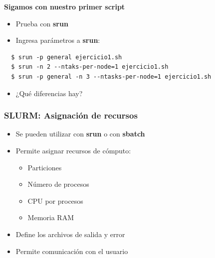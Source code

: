 \documentclass[aspectratio=169,professionalfonts]{beamer}
\newenvironment{minted}[2][]{\VerbatimEnvironment\begin{Verbatim}[#1]}{\end{Verbatim}}
\begin{document}
\begin{frame}[fragile]
{\textbf{Sigamos con nuestro primer script}}
\begin{itemize}
    \item Prueba con \textbf{srun}\vspace{0.5em}
    \vspace{0.5em}
    \item Ingresa parámetros a \textbf{srun}:
    \vspace{0.5em}
   \end{itemize} 



  \begin{verbatim}
  $ srun -p general ejercicio1.sh
  $ srun -n 2 --ntaks-per-node=1 ejercicio1.sh
  $ srun -p general -n 3 --ntasks-per-node=1 ejercicio1.sh
  \end{verbatim} 
  \vspace{0.5em}
    \begin{itemize}
        \item ¿Qué diferencias hay?
    \end{itemize}
    \end{frame}

\begin{frame}[fragile]
\frametitle{\textbf{SLURM: Asignación de recursos}}
\begin{itemize}
    \item Se pueden utilizar con \textbf{srun} o con \textbf{sbatch}
    \vspace{0.5em}
    \item Permite asignar recursos de cómputo:
    \vspace{0.5em}
    \begin{itemize}
        \item Particiones
        \item Número de procesos
        \item CPU por procesos
        \item Memoria RAM
    \end{itemize}
    \item Define los archivos de salida y error
    \vspace{0.5em}
    \item Permite comunicación con el usuario
\end{itemize}
    
\end{frame}
\end{document}
